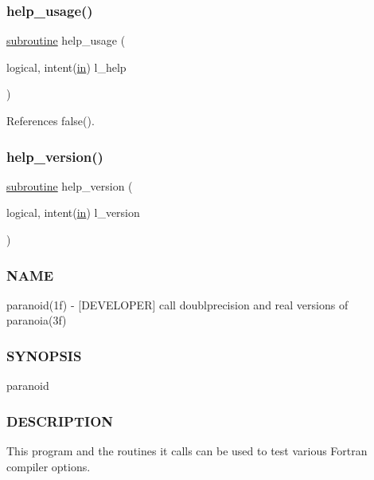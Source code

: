 \subsubsection{\texorpdfstring{help\+\_\+usage()}{help\_usage()}}
{\footnotesize\ttfamily \hyperlink{M__stopwatch_83_8txt_acfbcff50169d691ff02d4a123ed70482}{subroutine} help\+\_\+usage (\begin{DoxyParamCaption}\item[{logical, intent(\hyperlink{M__journal_83_8txt_afce72651d1eed785a2132bee863b2f38}{in})}]{l\+\_\+help }\end{DoxyParamCaption})}



References false().

\mbox{\label{paranoid_8f90_a39c21619b08a3c22f19e2306efd7f766}} 
\subsubsection{\texorpdfstring{help\+\_\+version()}{help\_version()}}
{\footnotesize\ttfamily \hyperlink{M__stopwatch_83_8txt_acfbcff50169d691ff02d4a123ed70482}{subroutine} help\+\_\+version (\begin{DoxyParamCaption}\item[{logical, intent(\hyperlink{M__journal_83_8txt_afce72651d1eed785a2132bee863b2f38}{in})}]{l\+\_\+version }\end{DoxyParamCaption})}



\subsubsection*{N\+A\+ME}

paranoid(1f) -\/ \mbox{[}D\+E\+V\+E\+L\+O\+P\+ER\mbox{]} call doublprecision and real versions of paranoia(3f) \subsubsection*{S\+Y\+N\+O\+P\+S\+IS}

paranoid \subsubsection*{D\+E\+S\+C\+R\+I\+P\+T\+I\+ON}

This program and the routines it calls can be used to test various Fortran compiler options.

